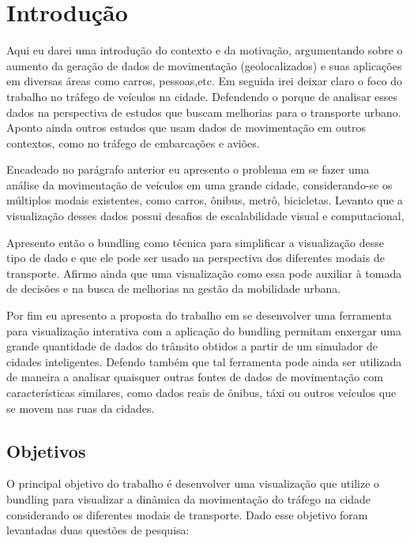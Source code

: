 \chapter{Introdução}
\label{cap:introducao}

Aqui eu darei uma introdução do contexto e da motivação, argumentando sobre o aumento da geração de dados de
movimentação (geolocalizados) e suas aplicações em diversas áreas como carros,
pessoas,etc. Em seguida irei deixar claro o foco do trabalho no tráfego de veículos 
na cidade. Defendendo o porque de analisar esses dados na
perspectiva de estudos que buscam melhorias para o transporte urbano. Aponto
ainda outros estudos que usam dados de movimentação em outros contextos, como no tráfego de embarcações e aviões.

Encadeado no parágrafo anterior eu apresento o problema em se fazer
uma análise da movimentação de veículos em uma grande cidade, considerando-se
os múltiplos modais existentes, como carros, ônibus, metrô, bicicletas. Levanto
que a visualização desses dados possui desafios de escalabilidade visual e computacional,

Apresento então o bundling como técnica para simplificar a visualização desse tipo de dado
e que ele pode ser usado na perspectiva dos diferentes modais de transporte.
Afirmo ainda que uma visualização como essa pode auxiliar à tomada
de decisões e na busca de melhorias na gestão da mobilidade urbana.

Por fim eu apresento a proposta do trabalho em se
desenvolver uma ferramenta para visualização interativa com a aplicação do bundling 
permitam enxergar uma grande quantidade de dados do trânsito
obtidos a partir de um simulador de cidades inteligentes. Defendo também que tal
ferramenta pode ainda ser utilizada de maneira a analisar quaisquer outras fontes
de dados de movimentação com características similares, como dados
reais de ônibus, táxi ou outros veículos que se movem nas ruas da cidades.

\section{Objetivos}
\label{sec:objetivos}

O principal objetivo do trabalho é desenvolver uma visualização que utilize o bundling
para visualizar a dinâmica da movimentação do tráfego na cidade considerando
os diferentes modais de transporte. Dado esse objetivo foram levantadas duas questões de pesquisa:

